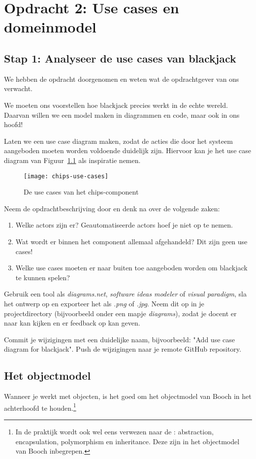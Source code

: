 \documentclass[dutch,a4paper,12pt,doubleside]{book}
\begin{document}
\setcounter{chapter}{1}
\chapter{Opdracht 2: Use cases en domeinmodel}

\section{Stap 1: Analyseer de use cases van blackjack}
We hebben de opdracht doorgenomen en weten wat de opdrachtgever van ons verwacht.

We moeten ons voorstellen hoe blackjack precies werkt in de echte wereld.
Daarvan willen we een model maken in diagrammen en code, maar ook in ons hoofd!

Laten we een use case diagram maken, zodat de acties die door het systeem
aangeboden moeten worden voldoende duidelijk zijn. Hiervoor kan je het use case 
diagram van Figuur~\ref{fig:chips-use-cases} als inspiratie nemen.

\begin{figure}[H]
    \centering
    \texttt{[image: chips-use-cases]}
    \caption{De use cases van het chips-component}
    \label{fig:chips-use-cases}
\end{figure}

Neem de opdrachtbeschrijving door en denk na over de volgende zaken:
\begin{enumerate}
    \item Welke actors zijn er? Geautomatiseerde actors hoef je niet op te nemen.
    \item Wat wordt er binnen het component allemaal afgehandeld? Dit zijn geen use cases!
    \item Welke use cases moeten er naar buiten toe aangeboden worden om blackjack te kunnen spelen?
\end{enumerate}

Gebruik een tool als \textit{diagrams.net}, \textit{software ideas modeler} of \textit{visual paradigm},
sla het ontwerp op en exporteer het als \textit{.png} of \textit{.jpg}. 
Neem dit op in je projectdirectory (bijvoorbeeld onder een mapje \textit{diagrams}),
zodat je docent er naar kan kijken en er feedback op kan geven.

Commit je wijzigingen met een duidelijke naam, 
bijvoorbeeld: "Add use case diagram for blackjack". 
Push de wijzigingen naar je remote GitHub repository.

\section{Het objectmodel}
Wanneer je werkt met objecten, is het goed om het objectmodel van Booch in 
het achterhoofd te houden.\footnote{
    In de praktijk wordt ook wel eens verwezen naar de : 
    abstraction, encapsulation, polymorphism en inheritance. 
    Deze zijn in het objectmodel van Booch inbegrepen.
}
\end{document}
